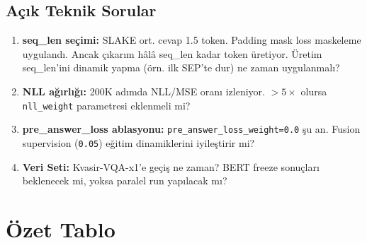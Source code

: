 \documentclass[12pt,a4paper]{article}
\begin{document}
\subsection{Açık Teknik Sorular}

\begin{enumerate}
    \item \textbf{seq\_len seçimi:} SLAKE ort. cevap 1.5 token. Padding mask loss maskeleme uygulandı. Ancak çıkarım hâlâ seq\_len kadar token üretiyor. Üretim seq\_len'ini dinamik yapma (örn. ilk SEP'te dur) ne zaman uygulanmalı?
    \item \textbf{NLL ağırlığı:} 200K adımda NLL/MSE oranı izleniyor. $> 5\times$ olursa \texttt{nll\_weight} parametresi eklenmeli mi?
    \item \textbf{pre\_answer\_loss ablasyonu:} \texttt{pre\_answer\_loss\_weight=0.0} şu an. Fusion supervision (\texttt{0.05}) eğitim dinamiklerini iyileştirir mi?
    \item \textbf{Veri Seti:} Kvasir-VQA-x1'e geçiş ne zaman? BERT freeze sonuçları beklenecek mi, yoksa paralel run yapılacak mı?
\end{enumerate}

\section*{Özet Tablo}
\end{document}
